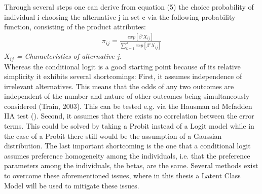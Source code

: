 \documentclass[12pt, abstracton]{article}
\begin{document}
Through several steps one can derive from equation (5) the choice probability of individual i choosing the alternative j in set c via the following probability function, consisting of the product attributes:
\begin{align}
\pi_{ij}= \frac{exp[\beta' X_{ij}]}{\sum_{k=1}^{J}{exp[\beta' X_{ij}]}}
\end{align}
\textit{$X_{ij}$ = Characteristics of alternative j}.\\
Whereas the conditional logit is a good starting point because of its relative simplicity it exhibits several shortcomings: First, it assumes independence of irrelevant alternatives. This means that the odds of any two outcomes are independent of the number and nature of other outcomes being simultaneously considered (Train, 2003). This can be tested e.g. via the Hausman ad Mcfadden IIA test (\cite{Hausman1984}). Second, it assumes that there exists no correlation between the error terms. This could be solved by taking a Probit instead of a Logit model while in the case of a Probit there still would be the assumption of a Gaussian distribution. The last important shortcoming is the one that a conditional logit assumes preference homogeneity among the individuals, i.e. that the preference parameters among the individuals, the betas, are the same. Several methods exist to overcome these aforementioned issues, where in this thesis a Latent Class Model will be used to mitigate these issues. 
\end{document}
